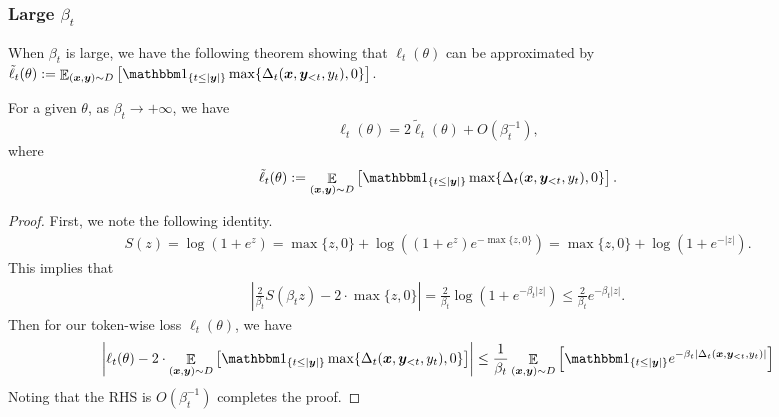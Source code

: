 

\subsubsection{Large $\beta_t$} 

When $\beta_t$ is large, we have the following theorem showing that $\ell_t(\theta)$
can be approximated by $\tilde{\ell}_t(\theta) := \E_{(\bx,\by)\sim D}  \left[ \onec{t \le |\by|} \max\{ \Delta_t(\bx, \by_{<t}, y_t), 0 \} \right]$.
\begin{theorem}
For a given $\theta$, as $\beta_t \to +\infty$, we have
\begin{equation*}
    \ell_t(\theta) = 2 \tilde{\ell}_t(\theta) + O(\beta_t^{-1}),
\end{equation*}
where 
\begin{equation*}
    \tilde{\ell}_t(\theta) := \E_{(\bx,\by)\sim D}  \left[ \onec{t \le |\by|} \max\{ \Delta_t(\bx, \by_{<t}, y_t), 0 \} \right].
\end{equation*}
\end{theorem}
\begin{proof}
    First, we note the following identity.
    \begin{align}
        S(z) = \log(1 + e^z) = \max\{z, 0\} + \log((1+e^z) e^{-\max\{z, 0\}})
        = \max\{z, 0\} + \log(1 + e^{-|z|}).
    \end{align}
    This implies that
    \begin{align}
        \left|\frac{2}{\beta_t}S(\beta_t z) - 2 \cdot \max\{z, 0\}\right|
            = \frac{2}{\beta_t} \log(1 + e^{-\beta_t |z|})
            \le \frac{2}{\beta_t} e^{-\beta_t |z|}.
    \end{align}
    Then for our token-wise loss $\ell_t(\theta)$, we have
    \begin{align}
        \left| \ell_t(\theta) 
        - 2 \cdot \E_{(\bx,\by)\sim D}  \left[ \onec{t \le |\by|} \max\{ \Delta_t(\bx, \by_{<t}, y_t), 0 \} \right]
        \right|
        \le 
        \frac{1}{\beta_t} \E_{(\bx,\by)\sim D}  \left[ \onec{t \le |\by|} e^{-\beta_t |\Delta_t(\bx, \by_{<t}, y_t)|} \right]
    \end{align}
    Noting that the RHS is $O(\beta_t^{-1})$ completes the proof.
\end{proof}
